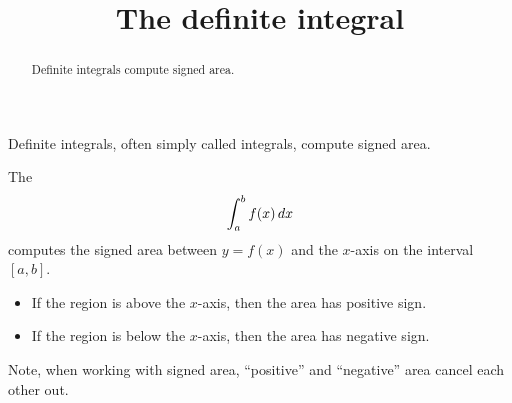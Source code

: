 \documentclass{ximera}
\title[Dig-In:]{The definite integral}
\begin{document}
\begin{abstract}
  Definite integrals compute signed area.
\end{abstract}
\maketitle


Definite integrals, often simply called integrals, compute signed area. 

\begin{definition}
The 
\[
\int_a^b f(x) \,d x
\]
computes the signed area between $y=f(x)$ and the $x$-axis on the
interval $[a,b]$.
\begin{itemize}
  \item If the region is above the $x$-axis, then the area has
    positive sign.
  \item If the region is below the $x$-axis, then the area has
    negative sign.
\end{itemize}
Note, when working with signed area, ``positive'' and ``negative''
area cancel each other out.
\end{definition}
\end{document}

